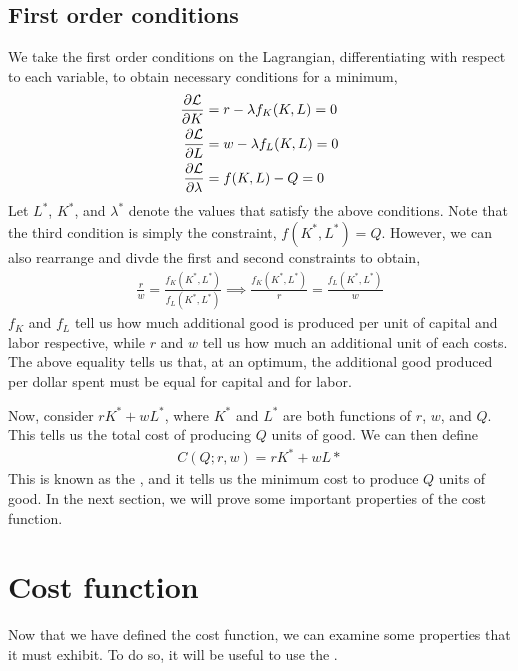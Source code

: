 \subsection*{First order conditions}
We take the first order conditions on the Lagrangian, differentiating with respect to each variable, to obtain necessary conditions for a minimum, 
\begin{align*}
    \frac{\partial \mathcal{L}}{\partial K} &= r - \lambda f_K(K, L) = 0 \\
    \frac{\partial \mathcal{L}}{\partial L} &= w - \lambda f_L(K, L) = 0 \\
    \frac{\partial \mathcal{L}}{\partial \lambda} &= f(K, L) - Q = 0
\end{align*}
Let $L^*$, $K^*$, and $\lambda^*$ denote the values that satisfy the above conditions. Note that the third condition is simply the constraint, $f(K^*, L^*) = Q$. However, we can also rearrange and divde the first and second constraints to obtain,
\begin{align}
    \frac{r}{w} = \frac{f_K(K^*, L^*)}{f_L(K^*, L^*)} \implies \frac{f_K(K^*, L^*)}{r} = \frac{f_L(K^*, L^*)}{w} \label{eq:marginal_cost_equal}
\end{align}
$f_K$ and $f_L$ tell us how much additional good is produced per unit of capital and labor respective, while $r$ and $w$ tell us how much an additional unit of each costs. The above equality tells us that, at an optimum, the additional good produced per dollar spent must be equal for capital and for labor. 

Now, consider $rK^* + wL^*$, where $K^*$ and $L^*$ are both functions of $r$, $w$, and $Q$. This tells us the total cost of producing $Q$ units of good. We can then define 
\begin{align*}
    C(Q; r, w) = rK^* + wL*
\end{align*}
This is known as the , and it tells us the minimum cost to produce $Q$ units of good. In the next section, we will prove some important properties of the cost function. 


\section{Cost function} 
Now that we have defined the cost function, we can examine some properties that it must exhibit. To do so, it will be useful to use the .

